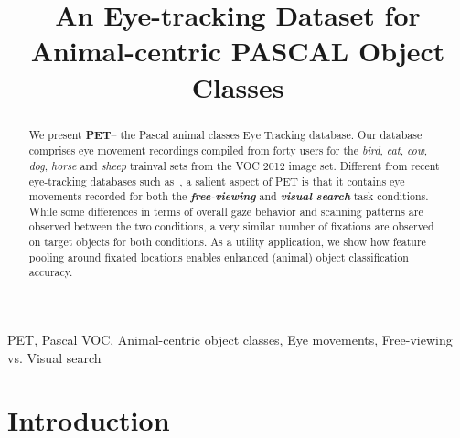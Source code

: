 \documentclass{article}
\begin{document}
\sloppy

\def\x{{\mathbf x}}
\def\L{{\cal L}}
\def\eg{\textit{e.g.}}
\def\ie{\textit{i.e.}}
\def\Eg{\textit{E.g.}}
\def\etal{\textit{et al.}}
\def\etc{\textit{etc.}}



\title{An Eye-tracking Dataset for Animal-centric PASCAL Object Classes}
\address{ SMME, National University of Sciences \& Technology, Islamabad, Pakistan \\
       Advanced Digital Sciences Center, University of Illinois at Urbana-Champaign, Singapore \\
			 Department of Computer Science and Information Engineering, University of Trento, Italy \\
			 Department of Cognitive Sciences, University of Trento, Italy \\
			omer@smme.nust.edu.pk,{subramanian.r,stefan.winkler}@adsc.com.sg}


\maketitle


\begin{abstract}
We present \textbf{PET}-- the Pascal animal classes Eye Tracking database. Our database comprises eye movement recordings compiled from forty users for the \textit{bird}, \textit{cat}, \textit{cow}, \textit{dog}, \textit{horse} and \textit{sheep} {trainval} sets from the VOC 2012 image set. Different from recent eye-tracking databases such as~\cite{kiwon_cvpr13_gaze,PapadopoulosCKF14}, a salient aspect of PET is that it contains eye movements recorded for both the \textit{\textbf{free-viewing}} and \textit{\textbf{visual search}} task conditions. While some differences in terms of overall gaze behavior and scanning patterns are observed between the two conditions, a very similar number of fixations are observed on target objects for both conditions. As a utility application, we show how feature pooling around fixated locations enables enhanced (animal) object classification accuracy.  
\end{abstract}
\begin{keywords}
PET, Pascal VOC, Animal-centric object classes, Eye movements, Free-viewing vs. Visual search
\end{keywords}


\section{Introduction}
\end{document}
